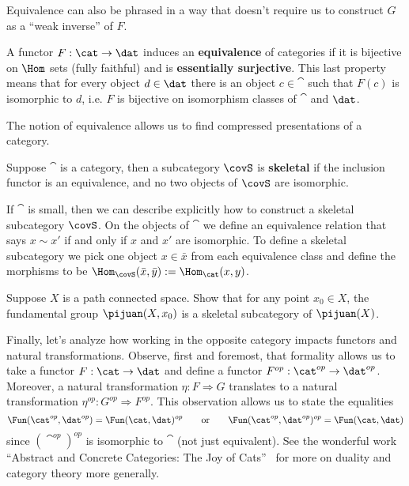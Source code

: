 Equivalence can also be phrased in a way that doesn't require us to construct $G$ as a ``weak inverse'' of $F$.
\begin{defn}
	A functor $F:\cat\to\dat$ induces an \textbf{equivalence} of categories if it is bijective on $\Hom$ sets (fully faithful) and is \textbf{essentially surjective}. This last property means that for every object $d\in\dat$ there is an object $c\in\cat$ such that $F(c)$ is isomorphic to $d$, i.e. $F$ is bijective on isomorphism classes of $\cat$ and $\dat$.
\end{defn}

The notion of equivalence allows us to find compressed presentations of a category.

\begin{defn}
	Suppose $\cat$ is a category, then a subcategory $\covS$ is \textbf{skeletal} if the inclusion functor is an equivalence, and no two objects of $\covS$ are isomorphic.
	
	If $\cat$ is small, then we can describe explicitly how to construct a skeletal subcategory $\covS$. On the objects of $\cat$ we define an equivalence relation that says $x\sim x'$ if and only if $x$ and $x'$ are isomorphic. To define a skeletal subcategory we pick one object $x\in\bar{x}$ from each equivalence class and define the morphisms to be $\Hom_{\covS}(\bar{x},\bar{y}):=\Hom_{\cat}(x,y)$.
\end{defn}

\begin{exr}
Suppose $X$ is a path connected space. Show that for any point $x_0\in X$, the fundamental group $\pijuan(X,x_0)$ is a skeletal subcategory of $\pijuan(X)$.
\end{exr}

Finally, let's analyze how working in the opposite category impacts functors and natural transformations. Observe, first and foremost, that formality allows us to take a functor $F:\cat\to\dat$ and define a functor $F^{op}:\cat^{op}\to\dat^{op}$. Moreover, a natural transformation $\eta:F\Rightarrow G$ translates to a natural transformation $\eta^{op}:G^{op}\Rightarrow F^{op}$. This observation allows us to state the equalities
\[
	\Fun(\cat^{op},\dat^{op})=\Fun(\cat,\dat)^{op} \qquad \mathrm{or} \qquad \Fun(\cat^{op},\dat^{op})^{op}=\Fun(\cat,\dat)
\]
since $(\cat^{op})^{op}$ is isomorphic to $\cat$ (not just equivalent). See the wonderful work ``Abstract and Concrete Categories: The Joy of Cats''~\cite{joyofcats} for more on duality and category theory more generally.


